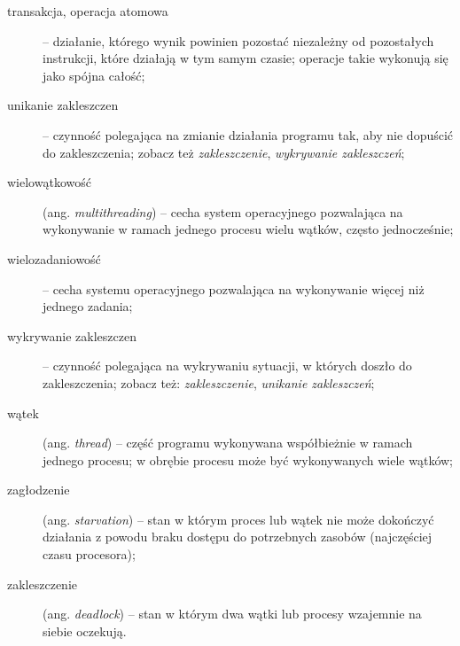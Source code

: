 \documentclass[12pt,leqno, twoside]{mwart}
\begin{document}
\begin{description}
\newpage
    \item[transakcja, operacja atomowa] -- działanie, którego wynik powinien pozostać niezależny od pozostałych instrukcji, które działają w tym samym czasie; operacje takie wykonują się jako spójna całość; \\
    \item[unikanie zakleszczen] -- czynność polegająca na zmianie działania programu tak, aby nie dopuścić do zakleszczenia; zobacz też \emph{zakleszczenie}, \emph{wykrywanie zakleszczeń};\\
    \item[wielowątkowość] (ang. \emph{multithreading}) -- cecha system operacyjnego pozwalająca na wykonywanie w ramach jednego procesu wielu wątków, często jednocześnie;\\
    \item[wielozadaniowość] -- cecha systemu operacyjnego pozwalająca na wykonywanie więcej niż jednego zadania;\\
    \item[wykrywanie zakleszczen] -- czynność polegająca na wykrywaniu sytuacji, w których doszło do zakleszczenia; zobacz też: \emph{zakleszczenie}, \emph{unikanie zakleszczeń};\\
    \item[wątek] (ang. \emph{thread}) -- część programu wykonywana współbieżnie w ramach jednego procesu; w obrębie procesu może być wykonywanych wiele wątków;\\
    \item[zagłodzenie] (ang. \emph{starvation}) -- stan w którym proces lub wątek nie może dokończyć działania z powodu braku dostępu do potrzebnych zasobów (najczęściej czasu procesora);\\
    \item[zakleszczenie] (ang. \emph{deadlock}) -- stan w którym dwa wątki lub procesy wzajemnie na siebie oczekują.\\
\end{description}
\end{document}
